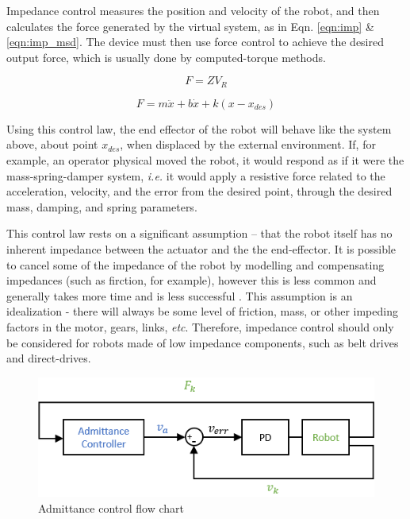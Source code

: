 \documentclass[12pt]{report}
\begin{document}
Impedance control measures the position and velocity of the robot, and then calculates the force generated by the virtual system, as in Eqn. \ref{eqn:imp} \& \ref{eqn:imp_msd}. The device must then use force control to achieve the desired output force, which is usually done by computed-torque methods. 

\begin{equation} \label{eqn:imp}
	F = ZV_R 
\end{equation}  

\begin{equation} \label{eqn:imp_msd}
	F = m\ddot{x} + b\dot{x} + k(x - x_{des})
\end{equation} 

Using this control law, the end effector of the robot will behave like the system above, about point $x_{des}$, when displaced by the external environment. If, for example, an operator physical moved the robot, it would respond as if it were the mass-spring-damper system, \textit{i.e.} it would apply a resistive force related to the acceleration, velocity, and the error from the desired point, through the desired mass, damping, and spring parameters.

	This control law rests on a significant assumption -- that the robot itself has no inherent impedance between the actuator and the the end-effector. It is possible to cancel some of the impedance of the robot by modelling and compensating impedances (such as firction, for example), however this is less common and generally takes more time and is less successful \cite{Colgate1988}. This assumption is an idealization - there will always be some level of friction, mass, or other impeding factors in the motor, gears, links, \textit{etc}. Therefore, impedance control should only be considered for robots made of low impedance components, such as belt drives and direct-drives. 
	
	\begin{figure}[h] 
		\centering
		\includegraphics[width=0.65\linewidth]{admittance_diagram}
		\caption{Admittance control flow chart}
		\label{fig:adm_diagram}
	\end{figure}
	
\end{document}
